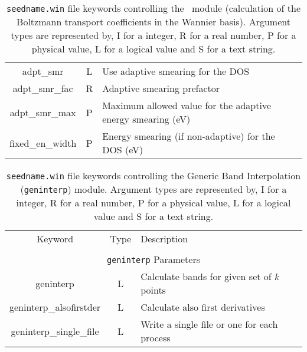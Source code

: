 \begin{table}[hH!]
\begin{center}
\begin{tabular}{|c|c|p{6cm}|}
{adpt\_smr} & L & Use adaptive smearing for the DOS \\
{adpt\_smr\_fac} & R & Adaptive smearing prefactor\\
{adpt\_smr\_max} & P & Maximum allowed value for the
adaptive energy smearing (eV)\\
{fixed\_en\_width} & P  & Energy smearing (if non-adaptive) for the DOS (eV) \\
\hline
\end{tabular}
\caption[Parameter file keywords controlling the \bw\ module.]
{{\tt seedname.win} file keywords controlling the \bw\ module (calculation of the Boltzmann transport coefficients in the Wannier basis). Argument types
are represented by, I for a integer, R for a real number, P for a
physical value, L for a logical value and S for a text string.}
\label{parameter_keywords_bw}
\end{center}
\end{table}

\begin{table}[hH!]
\begin{center}
\begin{tabular}{|c|c|p{6cm}|}
\hline
Keyword & Type & Description \\
        &      &             \\
\hline\hline
\multicolumn{3}{|c|}{{\tt geninterp} Parameters} \\
\hline
{\sc geninterp}   & L & Calculate bands for given set of $k$ points \\
{\sc geninterp\_alsofirstder} & L & Calculate also first derivatives\\ 
{\sc geninterp\_single\_file} & L & Write a single file or one for each
process\\ 
\hline
\end{tabular}
\caption[Parameter file keywords controlling the geninterp module.]
{{\tt seedname.win} file keywords controlling the Generic Band
  Interpolation ({\tt geninterp}) module. Argument types
are represented by, I for a integer, R for a real number, P for a
physical value, L for a logical value and S for a text string.}
\label{parameter_keywords_geninterp}
\end{center}
\end{table}

